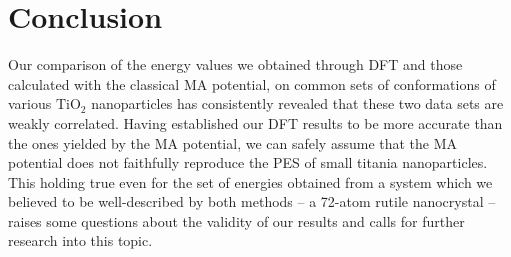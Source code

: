 \documentclass[aps,prb,twocolumn,amsmath,amssymb,superscriptaddress,longbibliography]{revtex4-1}
\newcommand\tab[1][1cm]{\hspace*{#1}} %
\begin{document}

 
 
\section*{Conclusion}


\tab Our comparison of the energy values we obtained through DFT and those calculated with the classical MA potential, on common sets of conformations of various $\text{TiO}_2$ nanoparticles has consistently revealed that these two data sets are weakly correlated.
Having established our DFT results to be more accurate than the ones yielded by the MA potential, we can safely assume that the MA potential does not faithfully reproduce the PES of small titania nanoparticles.
This holding true even for the set of energies obtained from a system which we believed to be well-described by both methods -- a 72-atom rutile nanocrystal -- raises some questions about the validity of our results and calls for further research into this topic.
\end{document}
